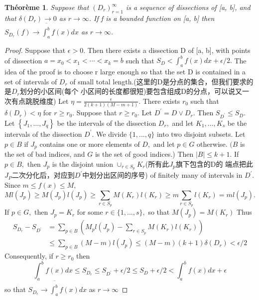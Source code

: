 \documentclass[12pt]{book}
\theoremstyle{definition}\newtheorem{dfn}{Définition}[chapter]
\theoremstyle{plain}\newtheorem{thm}{Théorème}[chapter]
\theoremstyle{plain}\newtheorem{prp}{Proposition}[chapter]
\theoremstyle{plain}\newtheorem{lem}{\bf Lemme}[chapter]
\theoremstyle{plain}\newtheorem{axm}{\bf Axiome}[chapter]
\theoremstyle{plain}\newtheorem{lmm}{\bf Lemme}[chapter]
\theoremstyle{plain}\newtheorem{cor}{\bf Corollaire}[chapter]
\theoremstyle{remark}\newtheorem{rem}{Remarque}[chapter]
\begin{document}
\begin{thm}
Suppose that $(D_r)^{\infty}_{r=1}$ is a sequence of dissections of [a, b],
and that $\delta(D_r) \to 0$ as $r \to \infty$. If f is a bounded function on [a, b] then
$S_{D_r}(f) \to\overline{\int^b_a} f(x) d x$ as $r\to\infty$.
\end{thm}
\begin{proof}
Suppose that $\epsilon > 0$. Then there exists a dissection D of [a, b],
with points of dissection $a = x_0 < x_1 < \cdots < x_k = b$ such that
$S_D <\int^b_a f(x) dx + \epsilon/2.$ The idea of the proof is to choose r large enough so
that the set D is contained in a set of intervals of $D_r$ of small
total length.(这里的D是分点的集合，但我们要求的是$D_r$划分的小区间(每个
小区间的长度都很短)要包含组成D的分点，可以说又一次有点跳脱维度) Let
$\eta = \frac{\epsilon}{2(k + 1)(M − m + 1)}$. There exists $r_0$ such that $\delta(D_r) < \eta$ for $r \ge r_0$.
Suppose that $r \geq r_{0} .$ Let $D^{\prime}=D \vee D_{r} .$ Then $S_{D^{\prime}} \leq S_{D} .$ Let $\left\{J_{1}, \ldots, J_{q}\right\}$
be the intervals of the dissection $D_{r},$ and let $K_{1}, \ldots,
K_{s}$ be the intervals of the dissection $D^{\prime} .$ We divide
$\{1, \ldots, q\}$ into two disjoint subsets. Let $p \in B$ if $J_{p}$
contains one or more elements of $D,$ and let $p \in G$
otherwise. $(B$ is the set of bad indices, and $G$ is the set of good
indices.) Then $|B| \leq k+1$. If $p \in B,$ then $J_{p}$ is the
disjoint union $\cup_{r \in S_{p}} K_{r}$(所有此$J_p$旗下包含的D的
端点把此$J_P$二次分化后，对应到$D^{\prime}$中划分出区间的序号) of finitely many of
intervals in $D^{\prime} .$  Since $m \le f(x) \le M,$
$$M l\left(J_{p}\right) \geq M\left(J_{p}\right) l\left(J_{p}\right) \geq \sum_{r \in S_{p}} M\left(K_{r}\right) l\left(K_{r}\right) \geq m \sum_{r \in S_{p}} l\left(K_{r}\right)=m l\left(J_{p}\right) .
$$
If $p \in G,$ then $J_{p}=K_{r}$ for some $r \in\{1, \ldots, s\},$ so that $M\left(J_{p}\right)=M\left(K_{r}\right)$ Thus
$$
\begin{aligned}
S_{D_{r}}-S_{D^{\prime}} &\left.=\sum_{p \in
    B} \left(M_{p}l\left(J_{p}\right)-\sum_{r \in S_{p}}
    M\left(K_{r}\right) l(K_{r}) \right)\right. \\
& \leq \sum_{p \in B}(M-m) l\left(J_{p}\right) \leq(M-m)(k+1) \delta\left(D_{r}\right)<\epsilon / 2
\end{aligned}
$$
Consequently, if $r \geq r_{0}$ then
$$
\int_{a}^{b} f(x) d x \leq S_{D_{r}} \leq S_{D^{\prime}}+\epsilon / 2 \leq S_{D}+\epsilon / 2<\int_{a}^{b} f(x) d x+\epsilon
$$
so that $S_{D_{r}} \rightarrow \overline{\int_{a}^{b}} f(x) d x$ as $r
\rightarrow \infty$


\end{proof}
\end{document}

